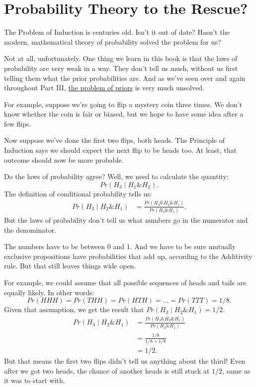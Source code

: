 \documentclass[justified]{tufte-book}
\newcommand{\given}{\mid}
\renewcommand{\wedge}{\mathbin{\&}}
\newcommand{\p}{Pr}
\theoremstyle{definition}
\theoremstyle{definition}
\theoremstyle{definition}
\theoremstyle{definition}
\theoremstyle{remark}
\begin{document}
\hypertarget{probability-theory-to-the-rescue}{%
\section*{Probability Theory to the Rescue?}\label{probability-theory-to-the-rescue}}

The Problem of Induction is centuries old. Isn't it out of date? Hasn't the modern, mathematical theory of probability solved the problem for us?

Not at all, unfortunately. One thing we learn in this book is that the laws of probability are very weak in a way. They don't tell us much, without us first telling them what the prior probabilities are. And as we've seen over and again throughout Part III, \protect\hyperlink{priors}{the problem of priors} is very much unsolved.

For example, suppose we're going to flip a mystery coin three times. We don't know whether the coin is fair or biased, but we hope to have some idea after a few flips.

Now suppose we've done the first two flips, both heads. The Principle of Induction says we should expect the next flip to be heads too. At least, that outcome should now be more probable.

Do the laws of probability agree? Well, we need to calculate the quantity:
\[ \p(H_3 \given H_1 \wedge H_2).\]
The definition of conditional probability tells us:
\[
  \begin{aligned}
    \p(H_3 \given H_2 \wedge H_1)
      &= \frac{\p(H_3 \wedge H_2 \wedge H_1)}{\p(H_2 \wedge H_1)}.
  \end{aligned}
\]
But the laws of probability don't tell us what numbers go in the numerator and the denominator.

The numbers have to be between \(0\) and \(1\). And we have to be sure mutually exclusive propositions have probabilities that add up, according to the Additivity rule. But that still leaves things wide open.

For example, we could assume that all possible sequences of heads and tails are equally likely. In other words:
\[ \p(HHH) = \p(THH) = \p(HTH) = \ldots = \p(TTT) = 1/8. \]
Given that assumption, we get the result that \(\p(H_3 \given H_2 \wedge H_1) = 1/2\).
\[
  \begin{aligned}
    \p(H_3 \given H_2 \wedge H_1)
      &= \frac{\p(H_3 \wedge H_2 \wedge H_1)}{\p(H_2 \wedge H_1)}\\
      &= \frac{1/8}{1/8 + 1/8}\\
      &= 1/2.
  \end{aligned}
\]
But that means the first two flips didn't tell us anything about the third! Even after we got two heads, the chance of another heads is still stuck at \(1/2\), same as it was to start with.
\end{document}
